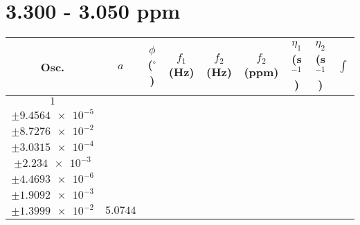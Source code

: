 \documentclass[8pt]{article}
\begin{document}
\section*{3.300 - 3.050 ppm}
\begin{longtable}[l]{c c c c c c c c c}
\toprule
Osc. & $a$ & $\phi$ ($^{\circ}$) & $f_1$ (Hz) & $f_2$ (Hz) & $f_2$ (ppm) & $\eta_1$ (s$^{-1}$) & $\eta_2$ (s$^{-1}$) & $\int$\\
\midrule
$\num{1}$ & \begin{tabular}[c]{@{}c@{}}$\num{6.1842e-2}$ \\ $\pm\num{9.4564e-5}$\end{tabular} & \begin{tabular}[c]{@{}c@{}}$\num{-0.6152}$ \\ $\pm\num{8.7276e-2}$\end{tabular} & \begin{tabular}[c]{@{}c@{}}$\num{-10.342}$ \\ $\pm\num{3.0315e-4}$\end{tabular} & \begin{tabular}[c]{@{}c@{}}$\num{1.5556e+3}$ \\ $\pm\num{2.234e-3}$\end{tabular} & \begin{tabular}[c]{@{}c@{}}$\num{3.112}$ \\ $\pm\num{4.4693e-6}$\end{tabular} & \begin{tabular}[c]{@{}c@{}}$\num{1.1828}$ \\ $\pm\num{1.9092e-3}$\end{tabular} & \begin{tabular}[c]{@{}c@{}}$\num{4.2346}$ \\ $\pm\num{1.3999e-2}$\end{tabular} & $\num{5.0744}$\\

\end{longtable}
\end{document}
